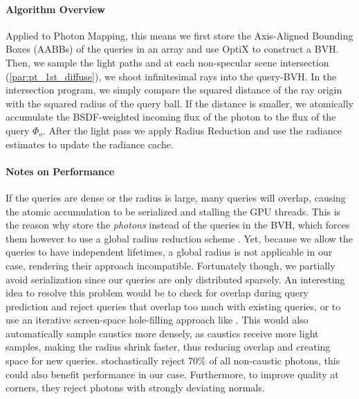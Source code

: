 \paragraph{Algorithm Overview}
Applied to Photon Mapping, this means we first store the Axis-Aligned Bounding Boxes (AABBs) of the queries in an array and use OptiX to construct a BVH.
Then, we sample the light paths and at each non-specular scene intersection (\cref{par:pt_1st_diffuse}), we shoot infinitesimal rays into the query-BVH.
In the intersection program, we simply compare the squared distance of the ray origin with the squared radius of the query ball.
If the distance is smaller, we atomically accumulate the BSDF-weighted incoming flux of the photon to the flux of the query $\Phi_o$.
After the light pass we apply Radius Reduction and use the radiance estimates to update the radiance cache.

\paragraph{Notes on Performance}
If the queries are dense or the radius is large, many queries will overlap, causing the atomic accumulation to be serialized and stalling the GPU threads.
This is the reason why \textcite{kern2023} store the \emph{photons} instead of the queries in the BVH, which forces them however to use a global radius reduction scheme \parencite{knaus2011}.
Yet, because we allow the queries to have independent lifetimes, a global radius is not applicable in our case, rendering their approach incompatible.
Fortunately though, we partially avoid serialization since our queries are only distributed sparsely.
An interesting idea to resolve this problem would be to check for overlap during query prediction and reject queries that overlap too much with existing queries, or to use an iterative screen-space hole-filling approach like \textcite{stachowiak2018}.
This would also automatically sample caustics more densely, as caustics receive more light samples, making the radius shrink faster, thus reducing overlap and creating space for new queries.
\textcite{kern2023} stochastically reject $70\%$ of all non-caustic photons, this could also benefit performance in our case.
Furthermore, to improve quality at corners, they reject photons with strongly deviating normals.


